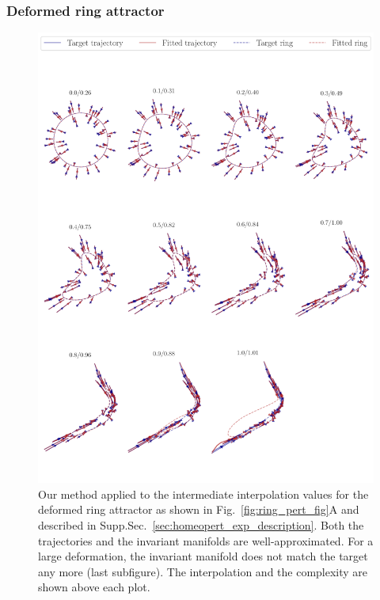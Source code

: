 \documentclass{article}
\theoremstyle{definition} \newtheorem{definition}{Definition}  \newtheorem{example}{Example}
\theoremstyle{remark} \newtheorem{remark}{Remark}
\newcounter{ct}
\begin{document}
\subsubsection{Deformed ring attractor}
\begin{figure}[htbp]
    \centering
    \includegraphics[width=\linewidth]{deformed_both_trajectories_asy}
    \caption{Our method applied to the intermediate interpolation values for the deformed ring attractor as shown in Fig.~\ref{fig:ring_pert_fig}A and described in 
	Supp.Sec.~\ref{sec:homeopert_exp_description}.
	Both the trajectories and the invariant manifolds are well-approximated. 
	For a large deformation, the invariant manifold does not match the target any more (last subfigure).
	The interpolation and the complexity are shown above each plot.
     }
    \label{fig:deformed_both_trajectories_asy}
\end{figure}
\end{document}
